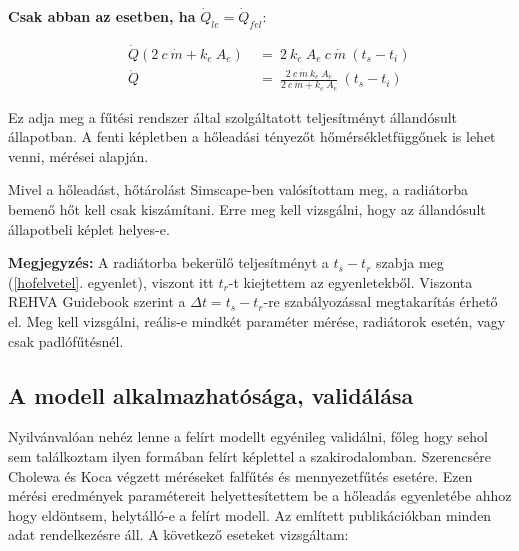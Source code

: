 \textbf{Csak abban az esetben, ha} $\dot Q_{le}=\dot Q_{fel}$:



\begin{equation} \label{holeadas4}
\begin{aligned}
~~~~~~\dot Q (2 ~ c ~ \dot{m} + k_e ~ A_e) & ~=~ 2 ~ k_e ~ A_e ~ c~ \dot{m} ~(t_s-t_i) \\[18pt]
~~~~~~\dot Q &~=~ \frac{2~c~\dot{m}~k_e~A_e}{2 ~c ~ \dot{m} + k_e ~ A_e}~(t_s-t_i)
\end{aligned}
\end{equation}

Ez adja meg a fűtési rendszer által szolgáltatott teljesítményt állandósult állapotban.
A fenti képletben a hőleadási tényezőt hőmérsékletfüggőnek is lehet venni, \cite{CHOLEWA2013599} mérései alapján.

Mivel a hőleadást, hőtárolást Simscape-ben valósítottam meg, a radiátorba bemenő hőt kell csak kiszámítani. Erre meg kell vizsgálni, hogy az állandósult állapotbeli képlet helyes-e.

\begin{formal}
	\textbf{Megjegyzés:} A radiátorba bekerülő teljesítményt a $t_s-t_r$ szabja meg (\ref{hofelvetel}. egyenlet), viszont itt $t_r$-t kiejtettem az egyenletekből. Viszonta REHVA Guidebook
	\cite{RehvaGuidebookNo7} szerint a $\Delta t= t_s-t_r$-re szabályozással megtakarítás érhető el. Meg kell vizsgálni, reális-e mindkét paraméter mérése, radiátorok esetén, vagy csak padlófűtésnél.
\end{formal}

%



\subsection{A modell alkalmazhatósága, validálása}

Nyilvánvalóan nehéz lenne a felírt modellt egyénileg validálni, főleg hogy sehol sem találkoztam ilyen formában felírt képlettel a szakirodalomban. Szerencsére Cholewa \cite{CHOLEWA2013599} és Koca \cite{Koca} végzett méréseket falfűtés és mennyezetfűtés esetére. Ezen mérési eredmények paramétereit helyettesítettem be a hőleadás egyenletébe ahhoz hogy eldöntsem, helytálló-e a felírt modell. Az említett publikációkban minden adat rendelkezésre áll. A következő eseteket vizsgáltam:


